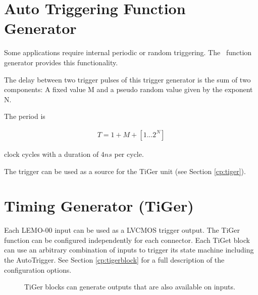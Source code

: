 
\pagebreak
\section{Auto Triggering Function Generator\label{cp:AutoTriggeringFunctionGenerator}}
Some applications require internal periodic or random triggering. The \deviceName\ function generator provides this functionality.\par

The delay between two trigger pulses of this trigger generator is the sum of two components: A fixed value M and a pseudo random value given by the exponent N. \par

The period is

\begin{align}
    T = 1 + M + [1...2^N]
\end{align}

clock cycles with a duration of $4 ns$ per cycle.\par

The trigger can be used as a source for the TiGer unit (see Section \ref{cp:tiger}).


\section{Timing Generator (TiGer)\label{cp:tiger}}
Each LEMO-00 input can be used as a LVCMOS trigger output. The TiGer function can be configured independently for each connector. 
Each TiGet block can use an arbitrary combination of inputs to trigger its state machine including the AutoTrigger.
See Section \ref{cp:tigerblock} for a full description of the configuration options.

%
\begin{figure*}[ht]
    \begin{center}
        \caption{TiGer blocks can generate outputs that are also available on inputs.\label{fig:matrix}}
    \end{center}
\end{figure*}
%

